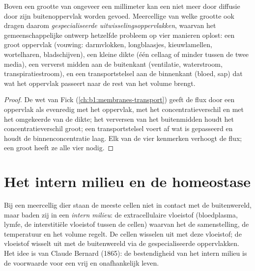\begin{proposition}\label{prop:b1:organism-environment:surfaces}
Boven een grootte van ongeveer een millimeter kan een  niet meer
door diffusie door zijn buitenoppervlak worden gevoed. Meercellige
 van welke grootte ook dragen daarom
\emph{gespecialiseerde uitwisselingsoppervlakken}, waarvan het gemeenschappelijke ontwerp hetzelfde probleem op vier
manieren oplost: een groot oppervlak (vouwing: darmvlokken, longblaasjes,
kieuwlamellen, wortelharen, bladschijven), een kleine dikte (één cellaag of
minder tussen de twee media), een ververst midden aan de buitenkant
(ventilatie, waterstroom, transpiratiestroom), en een transportstelsel aan
de binnenkant (bloed, sap) dat wat het oppervlak passeert naar de rest van
het volume brengt.
\end{proposition}
\begin{proof}
De wet van Fick (\cref{ch:b1:membranes-transport}) geeft de flux door een
oppervlak als evenredig met het oppervlak, met het concentratieverschil en
met het omgekeerde van de dikte; het verversen van het buitenmidden houdt
het concentratieverschil groot; een transportstelsel voert af wat is
gepasseerd en houdt de binnenconcentratie laag. Elk van de vier kenmerken
verhoogt de flux; een groot  heeft ze alle vier nodig.
\end{proof}

\section{Het intern milieu en de homeostase}

\begin{definition}\label{def:b1:organism-environment:milieu}
Bij een meercellig dier staan de meeste cellen niet in contact met de
buitenwereld, maar baden zij in een \emph{intern milieu}: de extracellulaire vloeistof (bloedplasma, lymfe, de
interstitiële vloeistof tussen de cellen) waarvan het  de
samenstelling, de temperatuur en het volume regelt. De cellen wisselen uit
met deze vloeistof; de vloeistof wisselt uit met de buitenwereld via de
gespecialiseerde oppervlakken. Het idee is van Claude Bernard (1865): de
bestendigheid van het intern milieu is de voorwaarde voor een vrij en
onafhankelijk leven.
\end{definition}

